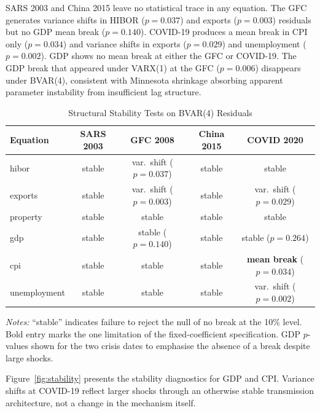 \documentclass[12pt,a4paper]{article}
\begin{document}
SARS 2003 and China 2015 leave no statistical trace in any equation. The GFC
generates variance shifts in HIBOR ($p = 0.037$) and exports ($p = 0.003$)
residuals but no GDP mean break ($p = 0.140$). COVID-19 produces a mean break
in CPI only ($p = 0.034$) and variance shifts in exports ($p = 0.029$) and
unemployment ($p = 0.002$). GDP shows no mean break at either the GFC or
COVID-19. The GDP break that appeared under VARX(1) at the GFC ($p = 0.006$)
disappears under BVAR(4), consistent with Minnesota shrinkage absorbing apparent
parameter instability from insufficient lag structure.

\begin{table}[htbp]
\centering
\caption{Structural Stability Tests on BVAR(4) Residuals}
\label{tab:stability}
\small
\begin{tabular}{lcccc}
\toprule
Equation & SARS 2003 & GFC 2008 & China 2015 & COVID 2020 \\
\midrule
hibor        & stable & var.\ shift ($p = 0.037$) & stable & stable \\
exports      & stable & var.\ shift ($p = 0.003$) & stable & var.\ shift ($p = 0.029$) \\
property     & stable & stable                     & stable & stable \\
gdp          & stable & stable ($p = 0.140$)       & stable & stable ($p = 0.264$) \\
cpi          & stable & stable                     & stable & \textbf{mean break} ($p = 0.034$) \\
unemployment & stable & stable                     & stable & var.\ shift ($p = 0.002$) \\
\bottomrule
\end{tabular}
\begin{minipage}{\linewidth}
\vspace{4pt}
\small\textit{Notes:} ``stable'' indicates failure to reject the null of no break
at the 10\% level. Bold entry marks the one limitation of the fixed-coefficient
specification. GDP $p$-values shown for the two crisis dates to emphasise the
absence of a break despite large shocks.
\end{minipage}
\end{table}

Figure~\ref{fig:stability} presents the stability diagnostics for GDP and CPI.
Variance shifts at COVID-19 reflect larger shocks through an otherwise stable
transmission architecture, not a change in the mechanism itself.
\end{document}

